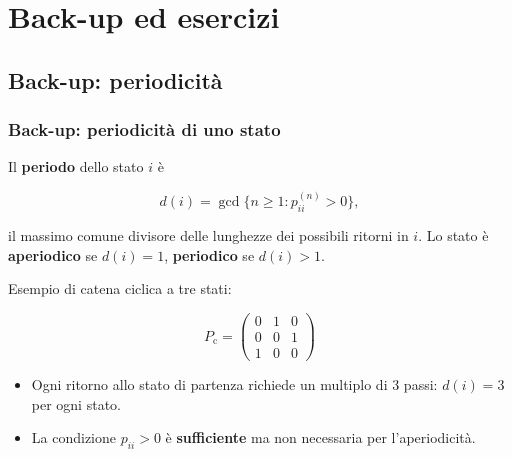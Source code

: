 \documentclass[handout]{beamer}%
\newenvironment{stepitemize}{\begin{itemize}[<+->]}{\end{itemize} }
\providecommand{\QTR}[2]{\csname #1\endcsname{#2}}
\begin{document}


\section{Back-up ed esercizi}

\subsection{Back-up: periodicit\`{a}}%

\begin{frame}%
%

\frametitle{Back-up: periodicit\`{a} di uno stato}%
%

%


Il \textbf{periodo} dello stato $i$ \`{e}%

\[
d(i) = \gcd\{ n\geq1 : p_{ii}^{(n)}>0 \},
\]


il massimo comune divisore delle lunghezze dei possibili ritorni in $i$. Lo
stato \`{e} \textbf{aperiodico} se $d(i)=1$, \textbf{periodico} se $d(i)>1$.

\medskip

Esempio di catena ciclica a tre stati:%

\[
P_{\mathrm{c}} =
\begin{pmatrix}
0 & 1 & 0\\
0 & 0 & 1\\
1 & 0 & 0
\end{pmatrix}
\]


\medskip

\begin{stepitemize}
\item Ogni ritorno allo stato di partenza richiede un multiplo di $3$ passi:
$d(i)=3$ per ogni stato.

\item La condizione $p_{ii}>0$ \`{e} \textbf{sufficiente} ma non necessaria
per l'aperiodicit\`{a}.
\end{stepitemize}%

\transboxout
\end{frame}%
\end{document}
